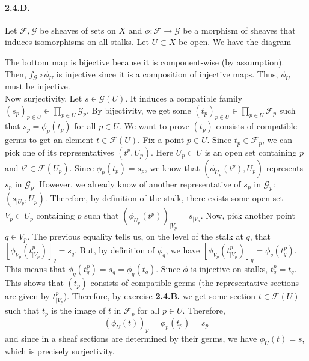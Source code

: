 \documentclass{article}
\newcommand{\Fsheaf}{\mathscr{F}}
\newcommand{\Gsheaf}{\mathscr{G}}
\begin{document}
\paragraph{2.4.D.} Let $\Fsheaf,\Gsheaf$ be sheaves of sets on $X$ and $\phi : \Fsheaf \to \Gsheaf$ be a morphism of sheaves that induces isomorphisms on all stalks. Let $U \subset X$ be open. We have the diagram
\begin{center}
\end{center}

The bottom map is bijective because it is component-wise (by assumption). Then, $f_\Gsheaf \circ \phi_U$ is injective since it is a composition of injective maps. Thus, $\phi_U$ must be injective. \\
Now surjectivity. Let $s \in \Gsheaf(U)$. It induces a compatible family $(s_p)_{p \in U} \in \prod_{p \in U} \Gsheaf_p$. By bijectivity, we get some $(t_p)_{p \in U} \in \prod_{p \in U} \Fsheaf_p$ such that $s_p = \phi_p (t_p)$ for all $p \in U$. We want to prove $(t_p)$ consists of compatible germs to get an element $t \in \Fsheaf(U)$. Fix a point $p \in U$. Since $t_p \in \Fsheaf_p$, we can pick one of its representatives $(t^p, U_p)$. Here $U_p \subset U$ is an open set containing $p$ and $t^p \in \Fsheaf(U_p)$. Since $\phi_p (t_p) = s_p$, we know that $(\phi_{U_p}(t^p),U_p)$ represents $s_p$ in $\Gsheaf_p$. However, we already know of another representative of $s_p$ in $\Gsheaf_p$: $(s_{\mid U_p},U_p)$. Therefore, by definition of the stalk, there exists some open set $V_p \subset U_p$ containing $p$ such that $(\phi_{U_p}(t^p))_{\mid V_p} = s_{\mid V_p}$. Now, pick another point $q \in V_p$. The previous equality tells us, on the level of the stalk at $q$, that $[\phi_{V_p}(t_{\mid V_p}^p)]_q = s_q$. But, by definition of $\phi_q$, we have $[\phi_{V_p}(t_{\mid V_p}^p)]_q = \phi_q (t^p_q)$. This means that $\phi_q(t^p_q) = s_q = \phi_q (t_q)$. Since $\phi$ is injective on stalks, $t^p_q = t_q$. This shows that $(t_p)$ consists of compatible germs (the representative sections are given by $t^p_{\mid V_p}$). Therefore, by exercise \textbf{2.4.B.} we get some section $t \in \Fsheaf(U)$ such that $t_p$ is the image of $t$ in $\Fsheaf_p$ for all $p \in U$. Therefore,
\[(\phi_U (t))_p = \phi_p (t_p) = s_p \]
and since in a sheaf sections are determined by their germs, we have $\phi_U(t) = s$, which is precisely surjectivity.
\end{document}
